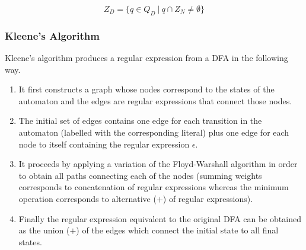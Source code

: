 \begin{equation*}
    Z_D = \{q \in Q_D\ |\ q \cap Z_N \neq \emptyset\}
\end{equation*}

\subsubsection{Kleene's Algorithm}

Kleene's algorithm produces a regular expression from a DFA in the following way.
\begin{enumerate}
    \item It first constructs a graph whose nodes correspond to the states of the automaton and the edges are regular expressions that connect those nodes. 
    \item The initial set of edges contains one edge for each transition in the automaton (labelled with the corresponding literal) plus one edge for each node to itself containing the regular expression $\epsilon$.
    \item It proceeds by applying a variation of the Floyd-Warshall algorithm in order to obtain all paths connecting each of the nodes (summing weights corresponds to concatenation of regular expressions whereas the minimum operation corresponds to alternative ($+$) of regular expressions).
    \item Finally the regular expression equivalent to the original DFA can be obtained as the union ($+$) of the edges which connect the initial state to all final states.
\end{enumerate}